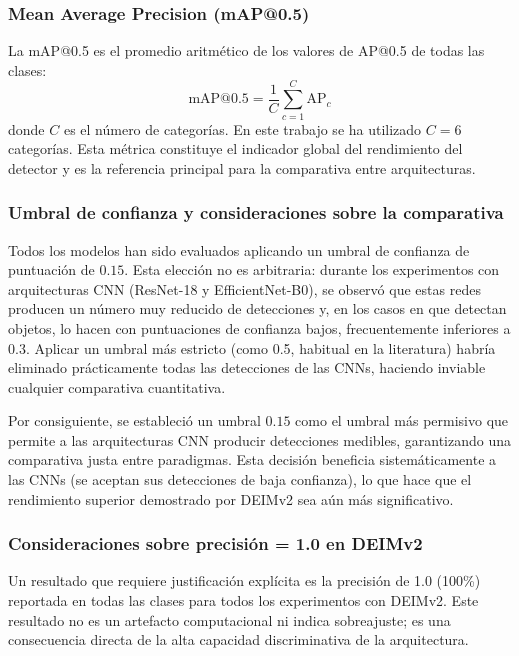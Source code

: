 \subsubsection{Mean Average Precision (mAP@0.5)}

La \acrfull{mAP}@0.5 es el promedio aritmético de los valores de AP@0.5 de todas las clases:
\begin{equation}
\text{mAP@0.5} = \frac{1}{C} \sum_{c=1}^{C} \text{AP}_c
\label{eq:map}
\end{equation}
donde $C$ es el número de categorías. En este trabajo se ha utilizado $C = 6$ categorías. Esta métrica constituye el indicador global del rendimiento del detector y es la referencia principal para la comparativa entre arquitecturas.

\subsubsection{Umbral de confianza y consideraciones sobre la comparativa}

Todos los modelos han sido evaluados aplicando un umbral de confianza de puntuación de $0.15$. Esta elección no es arbitraria: durante los experimentos con arquitecturas CNN (ResNet-18 y EfficientNet-B0), se observó que estas redes producen un número muy reducido de detecciones y, en los casos en que detectan objetos, lo hacen con puntuaciones de confianza bajos, frecuentemente inferiores a 0.3. Aplicar un umbral más estricto (como 0.5, habitual en la literatura) habría eliminado prácticamente todas las detecciones de las CNNs, haciendo inviable cualquier comparativa cuantitativa.

Por consiguiente, se estableció un umbral $0.15$ como el umbral más permisivo que permite a las arquitecturas CNN producir detecciones medibles, garantizando una comparativa justa entre paradigmas. Esta decisión beneficia sistemáticamente a las CNNs (se aceptan sus detecciones de baja confianza), lo que hace que el rendimiento superior demostrado por DEIMv2 sea aún más significativo.

\subsubsection{Consideraciones sobre precisión = 1.0 en DEIMv2}

Un resultado que requiere justificación explícita es la precisión de 1.0 (100\%) reportada en todas las clases para todos los experimentos con DEIMv2. Este resultado no es un artefacto computacional ni indica sobreajuste; es una consecuencia directa de la alta capacidad discriminativa de la arquitectura.

